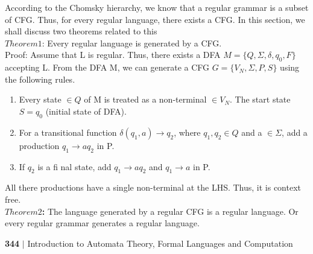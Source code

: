 \documentclass[a4]{article}
\begin{document}
\vspace*{0.2cm}
\small{
According to the Chomsky hierarchy, we know that a regular grammar is a subset of CFG. Thus, for
every regular language, there exists a CFG. In this section, we shall discuss two theorems related to this\\

\vspace*{0.2cm}
\textbf{$Theorem 1$}: Every regular language is generated by a CFG. \\

\vspace*{0.2cm}
Proof: Assume that L is regular. Thus, there exists a DFA $M = \{Q, \Sigma, \delta, q_{0}, F\}$ accepting L. From the
DFA M, we can generate a CFG $G = \{V_{N}, \Sigma, P, S \}$ using the following rules.\\
\vspace*{0.1cm}

\begin{enumerate}
  \item Every state $\in Q$ of M is treated as a non-terminal $\in V_{N}$. The start state $S = q_{0}$ (initial state of
DFA).\\
  \item For a transitional function $\delta(q_{1}, a) \rightarrow q_{2}$, where $q_{1}, q_{2} \in Q$ and a $\in \Sigma$, add a production $q_{1} \rightarrow aq_{2}$ in P.\\
  \item If $q_{2}$ is a fi nal state, add $q_{1}\rightarrow aq_{2}$ and $q_{1} \rightarrow a$ in P.\\
\end{enumerate}

\vspace*{0.1cm}
All there productions have a single non-terminal at the LHS. Thus, it is context free.\\

\vspace*{0.2cm}
\textbf{$Theorem 2$:} The language generated by a regular CFG is a regular language. Or every regular grammar
generates a regular language.\\
}

\newpage
 \begin{flushleft}
    \textbf{344}\hspace*{0.1cm} \textbf{$|$} \hspace*{0.1cm} Introduction to Automata Theory, Formal Languages and Computation
  \end{flushleft}
\vspace*{0.5cm}
\end{document}
